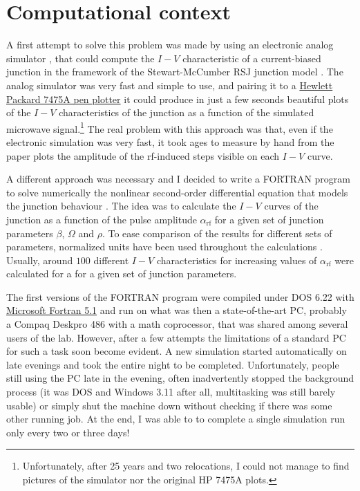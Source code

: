 \section{Computational context}
\label{computational-context}

A first attempt to solve this problem was made by using an electronic analog simulator \cite {Henry:1981}, that could compute the $I-V$ characteristic of a current-biased junction in the framework of the Stewart-McCumber RSJ junction model \cite{McCumber:1968, Stewart:1974}.
The analog simulator was very fast and simple to use, and pairing it to a \href{http://www.hpmuseum.net/display_item.php?hw=7}{Hewlett Packard 7475A pen plotter} it could produce in just a few seconds beautiful plots of the $I-V$ characteristics of the junction as a function of the simulated microwave signal.\footnote{Unfortunately, after 25 years and two relocations, I could not manage to find pictures of the simulator nor the original HP 7475A plots.} The real problem with this approach was that, even if the electronic simulation was very fast, it took ages to measure by hand from the paper plots the amplitude of the rf-induced steps visible on each $I-V$ curve.

A different approach was necessary and I decided to write a FORTRAN program to solve numerically the nonlinear second-order differential equation that models the junction behaviour \cite{McCumber:1968, Stewart:1974}. The idea was to calculate the $I-V$ curves of the junction as a function of the pulse amplitude $\alpha_\mathrm{rf}$ for a given set of junction parameters $\beta$, $\Omega$ and $\rho$. To ease comparison of the results for different sets of parameters, normalized units have been used throughout the calculations \cite{McCumber:1968, Stewart:1974}. Usually, around $100$ different $I-V$ characteristics for increasing values of $\alpha_\mathrm{rf}$ were calculated for a for a given set of junction parameters.

The first versions of the FORTRAN program were compiled under DOS 6.22 with \href{https://winworldpc.com/product/microsoft-fortran/5x}{Microsoft Fortran 5.1} and run on what was then a state-of-the-art PC, probably a Compaq Deskpro 486 with a math coprocessor, that was shared among several users of the lab. 
However, after a few attempts the limitations of a standard PC for such a task soon become evident. A new simulation started automatically on late evenings and took the entire night to be completed. Unfortunately, people still using the PC late in the evening, often inadvertently stopped the background process (it was DOS and Windows 3.11 after all, multitasking was still barely usable) or simply shut the machine down without checking if there was some other running job. At the end, I was able to to complete a single simulation run only every two or three days! 

